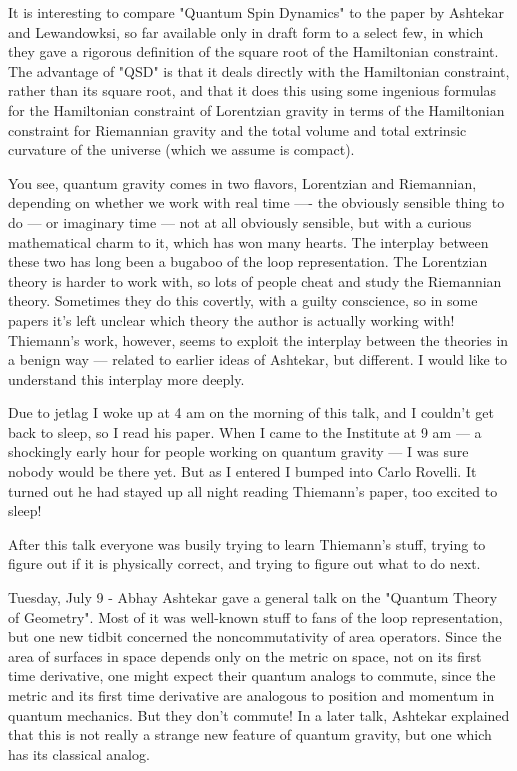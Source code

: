 It is interesting to compare "Quantum Spin Dynamics" to the
paper by Ashtekar and Lewandowksi, so far available only in draft form to a
select few, in which they gave a rigorous definition of the square
root of the Hamiltonian constraint.  The advantage of "QSD" is that it
deals directly with the Hamiltonian constraint, rather than its square
root, and that it does this using some ingenious formulas for the
Hamiltonian constraint of Lorentzian gravity in terms of the
Hamiltonian constraint for Riemannian gravity and the total volume and
total extrinsic curvature of the universe (which we assume is compact).

You see, quantum gravity comes in two flavors, Lorentzian and
Riemannian, depending on whether we work with real time ---- the
obviously sensible thing to do --- or imaginary time --- not at all
obviously sensible, but with a curious mathematical charm to it, which
has won many hearts.  The interplay between these two has long been a
bugaboo of the loop representation.  The Lorentzian theory is harder
to work with, so lots of people cheat and study the Riemannian theory.
Sometimes they do this covertly, with a guilty conscience, so in some
papers it's left unclear which theory the author is actually working
with!  Thiemann's work, however, seems to exploit the interplay
between the theories in a benign way --- related to earlier ideas of
Ashtekar, but different.  I would like to understand this interplay
more deeply.

Due to jetlag I woke up at 4 am on the morning of this talk, and I
couldn't get back to sleep, so I read his paper.  When I came to the
Institute at 9 am --- a shockingly early hour for people working on
quantum gravity --- I was sure nobody would be there yet.  But as I
entered I bumped into Carlo Rovelli.  It turned out he had stayed up
all night reading Thiemann's paper, too excited to sleep!  

After this talk everyone was busily trying to learn Thiemann's stuff,
trying to figure out if it is physically correct, and trying to figure
out what to do next.

Tuesday, July 9 - Abhay Ashtekar gave a general talk on the "Quantum
Theory of Geometry".  Most of it was well-known stuff to fans of the
loop representation, but one new tidbit concerned the noncommutativity
of area operators.  Since the area of surfaces in space depends only
on the metric on space, not on its first time derivative, one might
expect their quantum analogs to commute, since the metric and its
first time derivative are analogous to position and momentum in
quantum mechanics.  But they don't commute!  In a later talk, Ashtekar
explained that this is not really a strange new feature of quantum
gravity, but one which has its classical analog.

